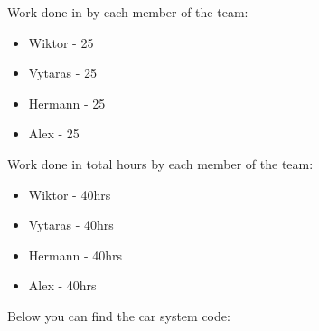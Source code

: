\documentclass[conference]{IEEEtran}
\begin{document}
Work done in \text{\%} by each member of the team:
\begin{itemize}
\item Wiktor - 25\text{\%}
\item Vytaras - 25\text{\%}
\item Hermann - 25\text{\%}
\item Alex - 25\text{\%}
\end{itemize}
Work done in total hours by each member of the team:
\begin{itemize}
\item Wiktor - 40hrs
\item Vytaras - 40hrs
\item Hermann - 40hrs
\item Alex - 40hrs
\end{itemize}
Below you can find the car system code:
\end{document}

